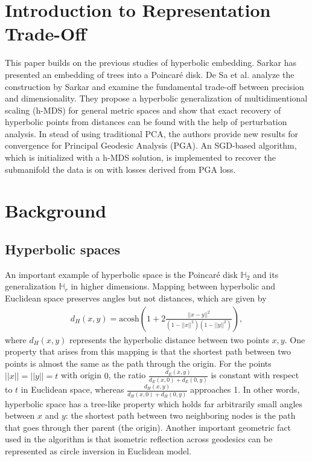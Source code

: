 

\section{Introduction to Representation Trade-Off}
This paper builds on the previous studies of hyperbolic embedding. Sarkar has presented an embedding of trees into a Poincar\'e disk. De Sa et al. analyze the construction by Sarkar and examine the fundamental trade-off between precision and dimensionality. They propose a hyperbolic generalization of multidimentional scaling (h-MDS) for general metric spaces and show that exact recovery of hyperbolic points from distances can be found with the help of perturbation analysis. In stead of using traditional PCA, the authors provide new results for convergence for Principal Geodesic Analysis (PGA).  An SGD-based algorithm, which is initialized with a h-MDS solution, is implemented to recover the submanifold the data is on with losses derived from PGA loss. 


\section{Background}
\subsection{Hyperbolic spaces}

An important example of hyperbolic space is the Poincar\'e disk $\mathbb{H}_2$ and its generalization $\mathbb{H}_r$ in higher dimensions. Mapping between hyperbolic and Euclidean space preserves angles but not distances, which are given by
\begin{align*}
    d_H(x, y) = \text{acosh}(1 + 2 \frac{||x-y||^2}{(1-||x||^2)(1 - ||y||^2)}),
\end{align*}
where $d_H(x, y)$ represents the hyperbolic distance between two points $x, y$. One property that arises from this mapping is that the shortest path between two points is almost the same as the path through the origin. For the points $||x||=||y|| = t$ with origin $0$, the ratio $\frac{d_E(x, y)}{d_E(x, 0) + d_E(0, y)}$ is constant with respect to $t$ in Euclidean space, whereas $\frac{d_H(x, y)}{d_H(x, 0) + d_H(0, y)}$ approaches 1. In other words, hyperbolic space has a tree-like property which holds far arbitrarily small angles between $x$ and $y$: the shortest path between two neighboring nodes is the path that goes through ther parent (the origin). Another important geometric fact used in the algorithm is that isometric reflection across geodesics can be represented as circle inversion in Euclidean model. 

